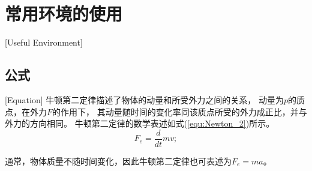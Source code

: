 
\chapter{常用环境的使用}[Useful Environment]
\section{公式}[Equation]
牛顿第二定律描述了物体的动量和所受外力之间的关系，
动量为$p$的质点，在外力$F$的作用下，
其动量随时间的变化率同该质点所受的外力成正比，并与外力的方向相同。
牛顿第二定律的数学表述如式(\ref{equ:Newton_2})所示。
\begin{equation}
  F_e=\frac{d}{dt}mv;
  \label{equ:Newton_2}
\end{equation}

\begin{note}
\end{note}

通常，物体质量不随时间变化，因此牛顿第二定律也可表述为$F_e=ma$。


